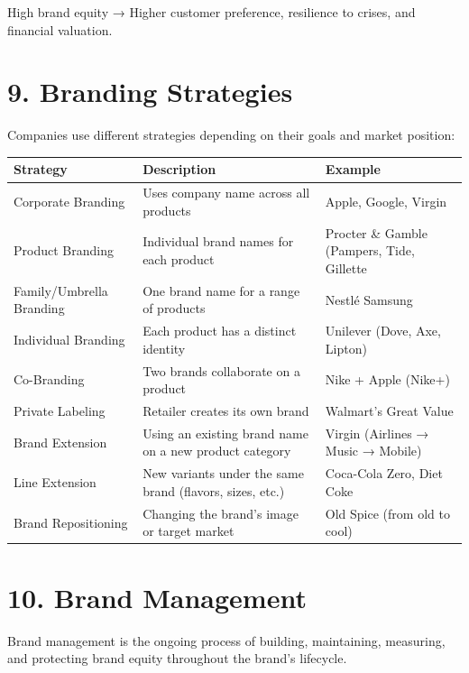 \documentclass[10pt]{article}
\begin{document}
High brand equity → Higher customer preference, resilience to crises, and financial valuation.

\section*{9. Branding Strategies}
Companies use different strategies depending on their goals and market position:

\begin{center}
\begin{tabular}{|l|l|l|}
\hline
Strategy & Description & Example \\
\hline
Corporate Branding & Uses company name across all products & Apple, Google, Virgin \\
\hline
Product Branding & Individual brand names for each product & Procter \& Gamble (Pampers, Tide, Gillette \\
\hline
Family/Umbrella Branding & One brand name for a range of products & Nestlé Samsung \\
\hline
Individual Branding & Each product has a distinct identity & Unilever (Dove, Axe, Lipton) \\
\hline
Co-Branding & Two brands collaborate on a product & Nike + Apple (Nike+) \\
\hline
Private Labeling & Retailer creates its own brand & Walmart's Great Value \\
\hline
Brand Extension & Using an existing brand name on a new product category & Virgin (Airlines → Music → Mobile) \\
\hline
Line Extension & New variants under the same brand (flavors, sizes, etc.) & Coca-Cola Zero, Diet Coke \\
\hline
Brand Repositioning & Changing the brand's image or target market & Old Spice (from old to cool) \\
\hline
\end{tabular}
\end{center}

\section*{10. Brand Management}
Brand management is the ongoing process of building, maintaining, measuring, and protecting brand equity throughout the brand's lifecycle.
\end{document}
